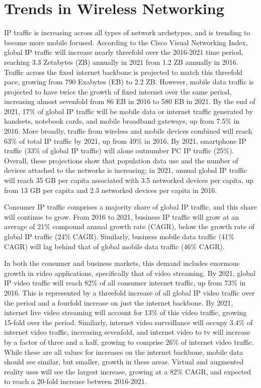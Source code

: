 \documentclass[12pt,dvipsnames]{report}
\begin{document}
\section{Trends in Wireless Networking} \label{sec:netreview}

IP traffic is increasing across all types of network archetypes, and is trending to become more mobile focused.  According to the Cisco Visual Networking Index, global IP traffic will increase nearly threefold over the 2016-2021 time period, reaching 3.3 Zetabytes (ZB) annually in 2021 from 1.2 ZB annually in 2016.  Traffic across the fixed internet backbone is projected to match this threefold pace, growing from 790 Exabytes (EB) to 2.2 ZB.  However, mobile data traffic is projected to have twice the growth of fixed internet over the same period, increasing almost sevenfold from 86 EB in 2016 to 580 EB in 2021.  By the end of 2021, 17\% of global IP traffic will be mobile data or internet traffic generated by handsets, notebook cards, and mobile broadband gateways, up from 7.5\% in 2016.  More broadly, traffic from wireless and mobile devices combined will reach 63\% of total IP traffic by 2021, up from 49\% in 2016.  By 2021, smartphone IP traffic (33\% of global IP traffic) will alone outnumber PC IP traffic (25\%).  Overall, these projections show that population data use and the number of devices attached to the networks is increasing; in 2021, annual global IP traffic will reach 35 GB per capita associated with 3.5 networked devices per capita, up from 13 GB per capita and 2.3 networked devices per capita in 2016.~\cite{ciscoVNI2017}

Consumer IP traffic comprises a majority share of global IP traffic, and this share will continue to grow.  From 2016 to 2021, business IP traffic will grow at an average of 21\% compound annual growth rate (CAGR), below the growth rate of global IP traffic (24\% CAGR).  Similarly, business mobile data traffic (41\% CAGR) will lag behind that of global mobile data traffic (46\% CAGR).~\cite{ciscoVNI2017}

In both the consumer and business markets, this demand includes enormous growth in video applications, specifically that of video streaming.  By 2021, global IP video traffic will reach 82\% of all consumer internet traffic, up from 73\% in 2016.  This is represented by a threefold increase of all global IP video traffic over the period and a fourfold increase on just the internet backbone.  By 2021, internet live video streaming will account for 13\% of this video traffic, growing 15-fold over the period.  Similarly, internet video surveillance will occupy 3.4\% of internet video traffic, increasing sevenfold, and internet video to tv will increase by a factor of three and a half, growing to comprise 26\% of internet video traffic.  While these are all values for increases on the internet backbone, mobile data should see similar, but smaller, growth in these areas.  Virtual and augmented reality uses will see the largest increase, growing at a 82\% CAGR, and expected to reach a 20-fold increase between 2016-2021.~\cite{ciscoVNI2017}
\end{document}

